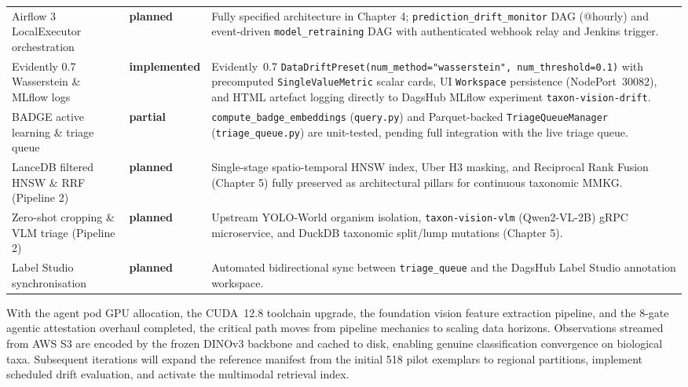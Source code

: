 \begin{longtable}{@{}p{} p{} p{}@{}}
\midrule
Airflow 3 LocalExecutor orchestration & \textbf{planned} & Fully specified architecture in Chapter 4; \texttt{prediction\_drift\_monitor} DAG (@hourly) and event-driven \texttt{model\_retraining} DAG with authenticated webhook relay and Jenkins trigger. \\
\addlinespace
Evidently 0.7 Wasserstein \& MLflow logs & \textbf{implemented} & Evidently~0.7 \texttt{DataDriftPreset(\allowbreak num\_method="wasserstein", \allowbreak num\_threshold=0.1)} with precomputed \texttt{SingleValueMetric} scalar cards, UI \texttt{Workspace} persistence (NodePort~30082), and HTML artefact logging directly to DagsHub MLflow experiment \texttt{taxon-vision-drift}. \\
\addlinespace
BADGE active learning \& triage queue & \textbf{partial} & \texttt{compute\_badge\_embeddings} (\texttt{query.py}) and Parquet-backed \texttt{TriageQueueManager} (\texttt{triage\_queue.py}) are unit-tested, pending full integration with the live triage queue. \\
\midrule
LanceDB filtered HNSW \& RRF (Pipeline 2) & \textbf{planned} & Single-stage spatio-temporal HNSW index, Uber H3 masking, and Reciprocal Rank Fusion (Chapter 5) fully preserved as architectural pillars for continuous taxonomic MMKG. \\
\addlinespace
Zero-shot cropping \& VLM triage (Pipeline 2) & \textbf{planned} & Upstream YOLO-World organism isolation, \texttt{taxon-vision-vlm} (Qwen2-VL-2B) gRPC microservice, and DuckDB taxonomic split/lump mutations (Chapter 5). \\
\addlinespace
Label Studio synchronisation & \textbf{planned} & Automated bidirectional sync between \texttt{triage\_queue} and the DagsHub Label Studio annotation workspace. \\
\end{longtable}

With the agent pod GPU allocation, the CUDA~12.8 toolchain upgrade, the foundation vision feature extraction pipeline, and the 8-gate agentic attestation overhaul completed, the critical path moves from pipeline mechanics to scaling data horizons. Observations streamed from AWS S3 are encoded by the frozen DINOv3 backbone and cached to disk, enabling genuine classification convergence on biological taxa. Subsequent iterations will expand the reference manifest from the initial 518 pilot exemplars to regional partitions, implement scheduled drift evaluation, and activate the multimodal retrieval index.
